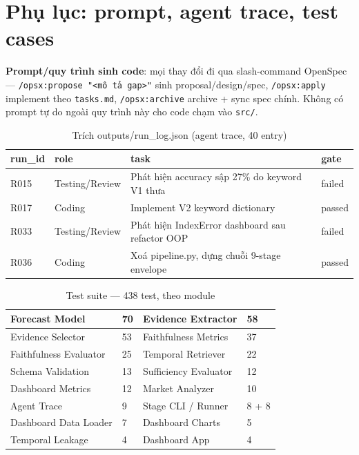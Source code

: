 \section{Phụ lục: prompt, agent trace, test cases}

\textbf{Prompt/quy trình sinh code}: mọi thay đổi đi qua slash-command OpenSpec — \texttt{/opsx:propose "<mô tả gap>"} sinh proposal/design/spec, \texttt{/opsx:apply} implement theo \texttt{tasks.md}, \texttt{/opsx:archive} archive + sync spec chính. Không có prompt tự do ngoài quy trình này cho code chạm vào \texttt{src/}.

\begin{table}[H]
\centering
\caption{Trích outputs/run\_log.json (agent trace, 40 entry)}
\begin{tabularx}{\textwidth}{|l|l|X|l|}
\hline
\textbf{run\_id} & \textbf{role} & \textbf{task} & \textbf{gate} \\ \hline
R015 & Testing/Review & Phát hiện accuracy sập 27\% do keyword V1 thưa & failed \\ \hline
R017 & Coding & Implement V2 keyword dictionary & passed \\ \hline
R033 & Testing/Review & Phát hiện IndexError dashboard sau refactor OOP & failed \\ \hline
R036 & Coding & Xoá pipeline.py, dựng chuỗi 9-stage envelope & passed \\ \hline
\end{tabularx}
\end{table}

\begin{table}[H]
\centering
\caption{Test suite — 438 test, theo module}
\begin{tabularx}{\textwidth}{|X|l|X|l|}
\hline
Forecast Model & 70 & Evidence Extractor & 58 \\ \hline
Evidence Selector & 53 & Faithfulness Metrics & 37 \\ \hline
Faithfulness Evaluator & 25 & Temporal Retriever & 22 \\ \hline
Schema Validation & 13 & Sufficiency Evaluator & 12 \\ \hline
Dashboard Metrics & 12 & Market Analyzer & 10 \\ \hline
Agent Trace & 9 & Stage CLI / Runner & 8 + 8 \\ \hline
Dashboard Data Loader & 7 & Dashboard Charts & 5 \\ \hline
Temporal Leakage & 4 & Dashboard App & 4 \\ \hline
\end{tabularx}
\end{table}
